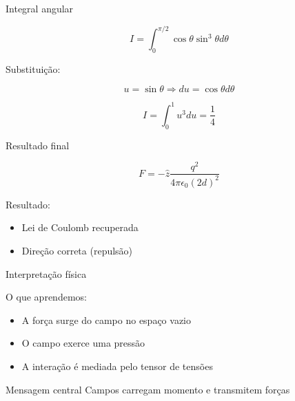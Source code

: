 \documentclass[aspectratio=169,11pt]{beamer}
\begin{document}
\begin{frame}{Integral angular}

\begin{eqbox}
\begin{equation}
I = \int_0^{\pi/2} \cos\theta \sin^3\theta d\theta
\end{equation}
\end{eqbox}

Substituição:

\[
u = \sin\theta \Rightarrow du = \cos\theta d\theta
\]

\begin{eqbox}
\begin{equation}
I = \int_0^1 u^3 du = \frac{1}{4}
\end{equation}
\end{eqbox}

\end{frame}

\begin{frame}{Resultado final}

\begin{eqbox}
\begin{equation}
F =
-\hat z
\frac{q^2}{4\pi\epsilon_0 (2d)^2}
\end{equation}
\end{eqbox}

\begin{mybox}
Resultado:
\begin{itemize}
\item Lei de Coulomb recuperada
\item Direção correta (repulsão)
\end{itemize}
\end{mybox}

\end{frame}

\begin{frame}{Interpretação física}

\begin{mybox}
O que aprendemos:
\end{mybox}

\begin{itemize}
\item A força surge do campo no espaço vazio
\item O campo exerce uma pressão
\item A interação é mediada pelo tensor de tensões
\end{itemize}

\begin{alertblock}{Mensagem central}
Campos carregam momento e transmitem forças
\end{alertblock}

\end{frame}
\end{document}
